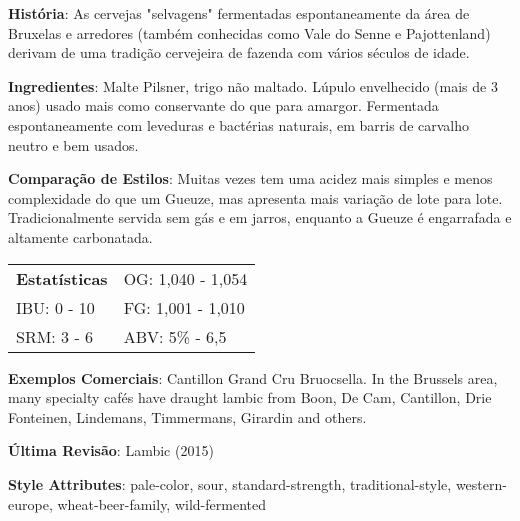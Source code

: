 \textbf{História}: As cervejas "selvagens" fermentadas espontaneamente da área de Bruxelas e arredores (também conhecidas como Vale do Senne e Pajottenland) derivam de uma tradição cervejeira de fazenda com vários séculos de idade.

\textbf{Ingredientes}: Malte Pilsner, trigo não maltado. Lúpulo envelhecido (mais de 3 anos) usado mais como conservante do que para amargor. Fermentada espontaneamente com leveduras e bactérias naturais, em barris de carvalho neutro e bem usados.

\textbf{Comparação de Estilos}: Muitas vezes tem uma acidez mais simples e menos complexidade do que um Gueuze, mas apresenta mais variação de lote para lote. Tradicionalmente servida sem gás e em jarros, enquanto a Gueuze é engarrafada e altamente carbonatada.

\begin{tabular}{@{}p{35mm}p{35mm}@{}}
  \textbf{Estatísticas} & OG: 1,040 - 1,054 \\
  IBU: 0 - 10  & FG: 1,001 - 1,010  \\
  SRM: 3 - 6  & ABV: 5\% - 6,5%
\end{tabular}

\textbf{Exemplos Comerciais}: Cantillon Grand Cru Bruocsella. In the Brussels area, many specialty cafés have draught lambic from Boon, De Cam, Cantillon, Drie Fonteinen, Lindemans, Timmermans, Girardin and others.

\textbf{Última Revisão}: Lambic (2015)

\textbf{Style Attributes}: pale-color, sour, standard-strength, traditional-style, western-europe, wheat-beer-family, wild-fermented


